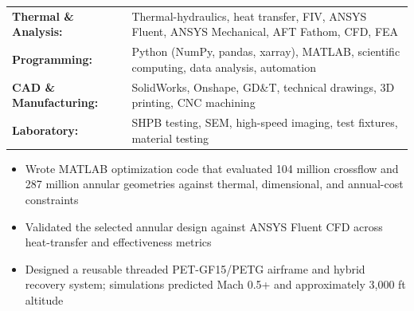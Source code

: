 \documentclass[10pt,letterpaper]{article}
\begin{document}
\vspace{2pt}
\researchEntry

\begin{tabularx}{\textwidth}{@{}>{\bfseries}l X@{}}
Thermal \& Analysis: & Thermal-hydraulics, heat transfer, FIV, ANSYS Fluent, ANSYS Mechanical, AFT Fathom, CFD, FEA \\
Programming: & Python (NumPy, pandas, xarray), MATLAB, scientific computing, data analysis, automation \\
CAD \& Manufacturing: & SolidWorks, Onshape, GD\&T, technical drawings, 3D printing, CNC machining \\
Laboratory: & SHPB testing, SEM, high-speed imaging, test fixtures, material testing
\end{tabularx}

\begin{itemize}
  \item Wrote MATLAB optimization code that evaluated 104 million crossflow and 287 million annular geometries against thermal, dimensional, and annual-cost constraints
  \item Validated the selected annular design against ANSYS Fluent CFD across heat-transfer and effectiveness metrics
\end{itemize}

\begin{itemize}
  \item Designed a reusable threaded PET-GF15/PETG airframe and hybrid recovery system; simulations predicted Mach 0.5+ and approximately 3,000 ft altitude
\end{itemize}
\end{document}
